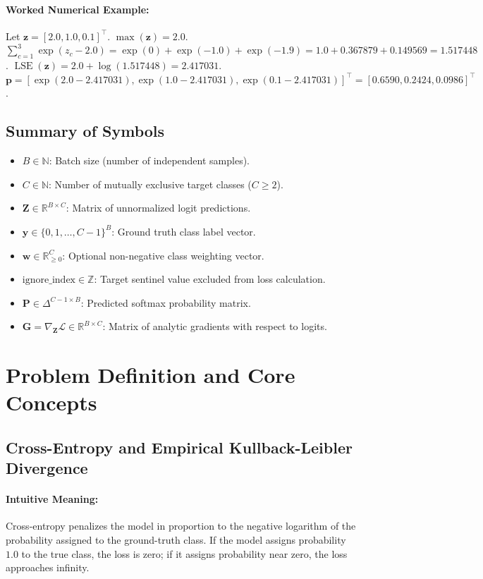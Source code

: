 \documentclass[11pt]{article}
\begin{document}
\paragraph{Worked Numerical Example:}
Let $\mathbf{z} = [2.0, 1.0, 0.1]^\top$.
$\max(\mathbf{z}) = 2.0$.
$\sum_{c=1}^3 \exp(z_c - 2.0) = \exp(0) + \exp(-1.0) + \exp(-1.9) = 1.0 + 0.367879 + 0.149569 = 1.517448$.
$\operatorname{LSE}(\mathbf{z}) = 2.0 + \log(1.517448) = 2.417031$.
$\mathbf{p} = [\exp(2.0 - 2.417031), \exp(1.0 - 2.417031), \exp(0.1 - 2.417031)]^\top = [0.6590, 0.2424, 0.0986]^\top$.

\subsection{Summary of Symbols}
\begin{itemize}
    \item $B \in \mathbb{N}$: Batch size (number of independent samples).
    \item $C \in \mathbb{N}$: Number of mutually exclusive target classes ($C \ge 2$).
    \item $\mathbf{Z} \in \mathbb{R}^{B \times C}$: Matrix of unnormalized logit predictions.
    \item $\mathbf{y} \in \{0, 1, \dots, C-1\}^B$: Ground truth class label vector.
    \item $\mathbf{w} \in \mathbb{R}_{\ge 0}^C$: Optional non-negative class weighting vector.
    \item $\mathrm{ignore\_index} \in \mathbb{Z}$: Target sentinel value excluded from loss calculation.
    \item $\mathbf{P} \in \Delta^{C-1 \times B}$: Predicted softmax probability matrix.
    \item $\mathbf{G} = \nabla_{\mathbf{Z}} \mathcal{L} \in \mathbb{R}^{B \times C}$: Matrix of analytic gradients with respect to logits.
\end{itemize}

\section{Problem Definition and Core Concepts}
\label{sec:problem_definition}

\subsection{Cross-Entropy and Empirical Kullback-Leibler Divergence}
\paragraph{Intuitive Meaning:} Cross-entropy penalizes the model in proportion to the negative logarithm of the probability assigned to the ground-truth class. If the model assigns probability $1.0$ to the true class, the loss is zero; if it assigns probability near zero, the loss approaches infinity.
\end{document}
